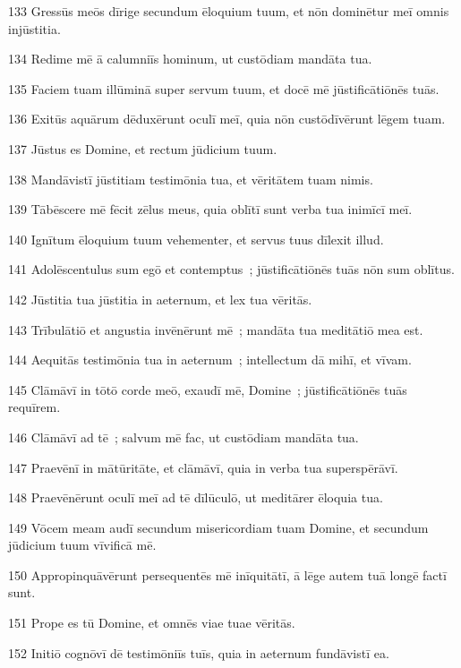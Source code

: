 \psalmVerse
  {133}
  {Gressūs meōs dīrige secundum ēloquium tuum, et nōn dominētur meī omnis injūstitia.}


\psalmVerse
  {134}
  {Redime mē ā calumniīs hominum, ut custōdiam mandāta tua.}


\psalmVerse
  {135}
  {Faciem tuam illūminā super servum tuum, et docē mē jūstificātiōnēs tuās.}


\psalmVerse
  {136}
  {Exitūs aquārum dēduxērunt oculī meī, quia nōn custōdīvērunt lēgem tuam.}


\psalmVerse
  {137}
  {Jūstus es Domine, et rectum jūdicium tuum.}


\psalmVerse
  {138}
  {Mandāvistī jūstitiam testimōnia tua, et vēritātem tuam nimis.}


\psalmVerse
  {139}
  {Tābēscere mē fēcit zēlus meus, quia oblītī sunt verba tua inimīcī meī.}


\psalmVerse
  {140}
  {Ignītum ēloquium tuum vehementer, et servus tuus dīlexit illud.}


\psalmVerse
  {141}
  {Adolēscentulus sum egō et contemptus~; jūstificātiōnēs tuās nōn sum oblītus.}


\psalmVerse
  {142}
  {Jūstitia tua jūstitia in aeternum, et lex tua vēritās.}


\psalmVerse
  {143}
  {Trībulātiō et angustia invēnērunt mē~; mandāta tua meditātiō mea est.}


\psalmVerse
  {144}
  {Aequitās testimōnia tua in aeternum~; intellectum dā mihī, et vīvam.}


\psalmVerse
  {145}
  {Clāmāvī in tōtō corde meō, exaudī mē, Domine~; jūstificātiōnēs tuās requīrem.}


\psalmVerse
  {146}
  {Clāmāvī ad tē~; salvum mē fac, ut custōdiam mandāta tua.}


\psalmVerse
  {147}
  {Praevēnī in mātūritāte, et clāmāvī, quia in verba tua superspērāvī.}


\psalmVerse
  {148}
  {Praevēnērunt oculī meī ad tē dīlūculō, ut meditārer ēloquia tua.}


\psalmVerse
  {149}
  {Vōcem meam audī secundum misericordiam tuam Domine, et secundum jūdicium tuum vīvificā mē.}


\psalmVerse
  {150}
  {Appropinquāvērunt persequentēs mē inīquitātī, ā lēge autem tuā longē factī sunt.}


\psalmVerse
  {151}
  {Prope es tū Domine, et omnēs viae tuae vēritās.}


\psalmVerse
  {152}
  {Initiō cognōvī dē testimōniīs tuīs, quia in aeternum fundāvistī ea.}


